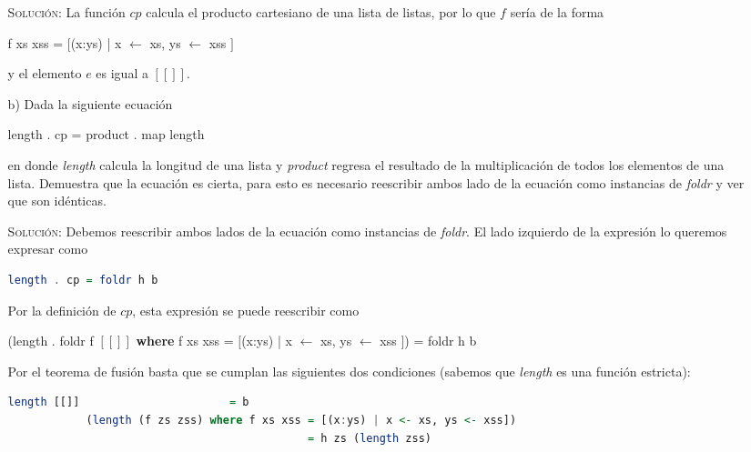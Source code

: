 \documentclass[letterpaper,11pt]{article}
\begin{document}
\begin{enumerate}
\begin{itemize}
        \textsc{Solución:} La función $cp$ calcula el producto cartesiano de 
        una lista de listas, por lo que $f$ sería de la forma 
        \begin{center}
            f xs xss = $[$(x:ys) | x $\leftarrow$ xs, ys $\leftarrow$ xss $]$
        \end{center}

        y el elemento $e$ es igual a $[[]]$.
        
        \item[b)] Dada la siguiente ecuación
        \begin{center}
            length . cp = product . map length
        \end{center} 

        en donde \textit{length} calcula la longitud de una lista y
        \textit{product} regresa el resultado de la multiplicación de todos los
        elementos de una lista. Demuestra que la ecuación es cierta, para esto
        es necesario reescribir ambos lado de la ecuación como instancias de 
        \textit{foldr} y ver que son idénticas.
        
        \textsc{Solución:} Debemos reescribir ambos lados de la ecuación como
        instancias de \textit{foldr}. El lado izquierdo de la expresión lo
        queremos expresar como 
        \begin{lstlisting}[language=Haskell]
            length . cp = foldr h b
        \end{lstlisting}
        
        Por la definición de $cp$, esta expresión se puede reescribir como
        \begin{center}
            (length . foldr f $[[]]$ \textbf{where} f xs xss =
            $[$(x:ys) | x $\leftarrow$ xs, ys $\leftarrow$ xss $]$) =
            foldr h b 
        \end{center}
       
        Por el teorema de fusión basta que se cumplan las siguientes dos 
        condiciones (sabemos que \textit{length} es una función estricta):
        \begin{lstlisting}[language=Haskell]
            length [[]]                       = b 
            (length (f zs zss) where f xs xss = [(x:ys) | x <- xs, ys <- xss])
                                              = h zs (length zss) 
        \end{lstlisting}
        

\end{itemize}
\end{enumerate}
\end{document}
